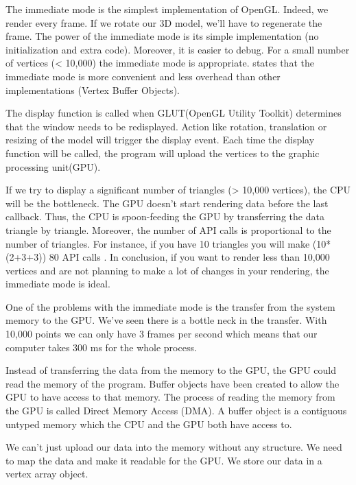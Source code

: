 The immediate mode is the simplest implementation of OpenGL. Indeed, we render every frame. If we rotate our 3D model, we'll have to regenerate the frame. The power of the immediate mode is its simple implementation (no initialization and extra code). Moreover, it is easier to debug. For a small number of vertices (< 10,000) the immediate mode is appropriate. \cite{opengl1} states that the immediate mode is more convenient and less overhead than other implementations (Vertex Buffer Objects).

The display function is called when GLUT(OpenGL Utility Toolkit) determines that the window needs to be redisplayed. Action like rotation, translation or resizing of the model will trigger the display event. Each time the display function will be called, the program will upload the vertices to the graphic processing unit(GPU).

If we try to display a significant number of triangles (> 10,000 vertices), the CPU will be the bottleneck. The GPU doesn't start rendering data before the last callback. Thus, the CPU is spoon-feeding the GPU by transferring the data triangle by triangle. Moreover, the number of API calls is proportional to the number of triangles. For instance, if you have 10 triangles you will make (10*(2+3+3)) 80 API calls \cite{opengllegacy}. In conclusion, if you want to render less than 10,000 vertices and are not planning to make a lot of changes in your rendering, the immediate mode is ideal.

One of the problems with the immediate mode is the transfer from the system memory to the GPU.  We've seen there is a bottle neck in the transfer. With 10,000 points we can only have 3 frames per second which means that our computer takes 300 ms for the whole process.

Instead of transferring the data from the memory to the GPU, the GPU could read the memory of the program. Buffer objects have been created to allow the GPU to have access to that memory. The process of reading the memory from the GPU is called Direct Memory Access (DMA). A buffer object is a contiguous untyped memory which the CPU and the GPU both have access to.

We can't just upload our data into the memory without any structure. We need to map the data and make it readable for the GPU. We store our data in a vertex array object.


